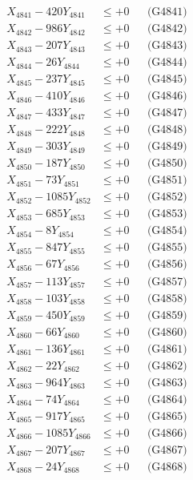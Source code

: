 \documentclass[a4paper,10pt]{article}
\begin{document}
{\begin{align}
\allowbreak
X_{4841} - 420Y_{4841} &\leq +0 && \text{(G4841)} \\
X_{4842} - 986Y_{4842} &\leq +0 && \text{(G4842)} \\
X_{4843} - 207Y_{4843} &\leq +0 && \text{(G4843)} \\
X_{4844} - 26Y_{4844} &\leq +0 && \text{(G4844)} \\
X_{4845} - 237Y_{4845} &\leq +0 && \text{(G4845)} \\
X_{4846} - 410Y_{4846} &\leq +0 && \text{(G4846)} \\
X_{4847} - 433Y_{4847} &\leq +0 && \text{(G4847)} \\
X_{4848} - 222Y_{4848} &\leq +0 && \text{(G4848)} \\
X_{4849} - 303Y_{4849} &\leq +0 && \text{(G4849)} \\
X_{4850} - 187Y_{4850} &\leq +0 && \text{(G4850)} \\
\allowbreak
X_{4851} - 73Y_{4851} &\leq +0 && \text{(G4851)} \\
X_{4852} - 1085Y_{4852} &\leq +0 && \text{(G4852)} \\
X_{4853} - 685Y_{4853} &\leq +0 && \text{(G4853)} \\
X_{4854} - 8Y_{4854} &\leq +0 && \text{(G4854)} \\
X_{4855} - 847Y_{4855} &\leq +0 && \text{(G4855)} \\
X_{4856} - 67Y_{4856} &\leq +0 && \text{(G4856)} \\
X_{4857} - 113Y_{4857} &\leq +0 && \text{(G4857)} \\
X_{4858} - 103Y_{4858} &\leq +0 && \text{(G4858)} \\
X_{4859} - 450Y_{4859} &\leq +0 && \text{(G4859)} \\
X_{4860} - 66Y_{4860} &\leq +0 && \text{(G4860)} \\
\allowbreak
X_{4861} - 136Y_{4861} &\leq +0 && \text{(G4861)} \\
X_{4862} - 22Y_{4862} &\leq +0 && \text{(G4862)} \\
X_{4863} - 964Y_{4863} &\leq +0 && \text{(G4863)} \\
X_{4864} - 74Y_{4864} &\leq +0 && \text{(G4864)} \\
X_{4865} - 917Y_{4865} &\leq +0 && \text{(G4865)} \\
X_{4866} - 1085Y_{4866} &\leq +0 && \text{(G4866)} \\
X_{4867} - 207Y_{4867} &\leq +0 && \text{(G4867)} \\
X_{4868} - 24Y_{4868} &\leq +0 && \text{(G4868)} \\

\end{align}}
\end{document}
